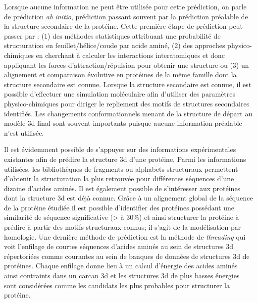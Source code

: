 Lorsque aucune information ne peut être utilisée pour cette prédiction, on parle de prédiction \textit{ab initio}, prédiction passant souvent par la prédiction préalable de la structure secondaire de la protéine. Cette première étape de prédiction peut passer par : (1) des méthodes statistiques attribuant une probabilité de structuration en feuillet/hélice/coude par acide aminé, (2) des approches physico-chimiques en cherchant à calculer les interactions interatomiques et donc appliquant les forces d'attraction/répulsion pour obtenir une structure ou (3) un alignement et comparaison évolutive en protéines de la même famille dont la structure secondaire est connue.
Lorsque la structure secondaire est connue, il est possible d'effectuer une simulation moléculaire afin d'utiliser des paramètres physico-chimiques pour diriger le repliement des motifs de structures secondaires identifiés. Les changements conformationnels menant de la structure de départ au modèle 3d final sont souvent importants puisque aucune information préalable n'est utilisée.

Il est évidemment possible de s'appuyer sur des informations expérimentales existantes afin de prédire la structure 3d d'une protéine. Parmi les informations utilisées, les bibliothèques de fragments ou alphabets structuraux permettent d'obtenir la structuration la plus retrouvée pour différentes séquences d'une dizaine d'acides aminés. 
Il est également possible de s'intéresser aux protéines dont la structure 3d est déjà connue. Grâce à un alignement global de la séquence de la protéine étudiée il est possible d'identifier des protéines possédant une similarité de séquence significative (> à 30\%) et ainsi structurer la protéine à prédire à partir des motifs structuraux connus; il s'agit de la modélisation par homologie.
Une dernière méthode de prédiction est la méthode de \textit{threading} qui voit l'enfilage de courtes séquences d'acides aminés au sein de structures 3d répertoriées comme courantes au sein de banques de données de structures 3d de protéines. Chaque enfilage donne lieu à un calcul d'énergie des acides aminés ainsi contraints dans un carcan 3d et les structures 3d de plus basses énergies sont considérées comme les candidats les plus probables pour structurer la protéine.


